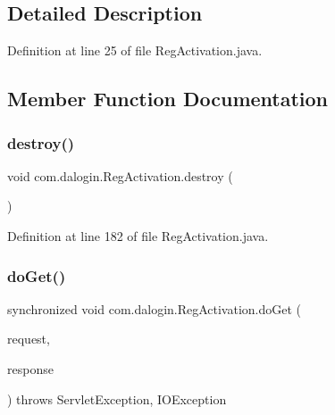 \subsection{Detailed Description}


Definition at line 25 of file Reg\+Activation.\+java.



\subsection{Member Function Documentation}
\mbox{\label{classcom_1_1dalogin_1_1_reg_activation_a31466087421b04e28b6f3cf5b0463a4f}} 
\subsubsection{\texorpdfstring{destroy()}{destroy()}}
{\footnotesize\ttfamily void com.\+dalogin.\+Reg\+Activation.\+destroy (\begin{DoxyParamCaption}{ }\end{DoxyParamCaption})}



Definition at line 182 of file Reg\+Activation.\+java.

\mbox{\label{classcom_1_1dalogin_1_1_reg_activation_a1cec7329dc6fac61960cf952a6b33abf}} 
\subsubsection{\texorpdfstring{do\+Get()}{doGet()}}
{\footnotesize\ttfamily synchronized void com.\+dalogin.\+Reg\+Activation.\+do\+Get (\begin{DoxyParamCaption}\item[{Http\+Servlet\+Request}]{request,  }\item[{Http\+Servlet\+Response}]{response }\end{DoxyParamCaption}) throws Servlet\+Exception, I\+O\+Exception}



